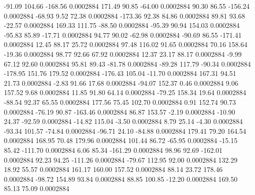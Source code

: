       -91.09      104.66     -168.56     0.0002884
      171.49       90.85      -64.00     0.0002884
       90.30       86.55     -156.24     0.0002884
      -68.93        9.52       72.38     0.0002884
     -173.36       92.38       84.86     0.0002884
       89.81       93.68      -22.57     0.0002884
      169.33      111.75      -88.50     0.0002884
      -95.39       90.94      154.03     0.0002884
      -95.83       85.89      -17.71     0.0002884
       94.77       90.02      -62.98     0.0002884
      -90.69       86.55     -171.41     0.0002884
       12.45       88.17       25.72     0.0002884
       97.48      116.02       91.65     0.0002884
       70.16      158.64      -19.36     0.0002884
       98.77       92.66       67.92     0.0002884
       12.37       23.17       88.17     0.0002884
       -9.99       67.12       92.60     0.0002884
       95.81       89.43      -81.78     0.0002884
      -89.28      117.79      -90.34     0.0002884
     -178.95      151.76      179.52     0.0002884
     -176.43      105.04      -11.70     0.0002884
      167.31       94.51       21.73     0.0002884
       -2.83       91.66       17.68     0.0002884
      -94.07      152.37        0.46     0.0002884
        9.06      157.52        9.68     0.0002884
       11.85       91.80       64.14     0.0002884
      -79.25      158.34       19.64     0.0002884
      -88.54       92.37       65.55     0.0002884
      177.56       75.45      102.70     0.0002884
        0.91      152.74       90.73     0.0002884
      -76.19       90.87     -163.46     0.0002884
       86.87      153.57       -2.19     0.0002884
      -10.90       24.37      -92.59     0.0002884
      -14.82      115.04       -3.50     0.0002884
        8.79       25.14       -4.30     0.0002884
      -93.34      101.57      -74.84     0.0002884
      -96.71       24.10      -84.88     0.0002884
      179.41       79.20      164.54     0.0002884
      168.95       70.48      179.96     0.0002884
      101.44       86.72      -65.95     0.0002884
      -15.15       85.42     -111.70     0.0002884
        6.06       85.34     -161.29     0.0002884
       98.96       92.69     -162.01     0.0002884
       92.23       94.25     -111.26     0.0002884
      -79.67      112.95       92.00     0.0002884
      132.29       18.92       55.57     0.0002884
      161.17      160.00      157.52     0.0002884
       88.14       23.72      178.46     0.0002884
      -98.72      154.89       93.84     0.0002884
       88.85      100.85      -12.20     0.0002884
      169.50       85.13       75.09     0.0002884
